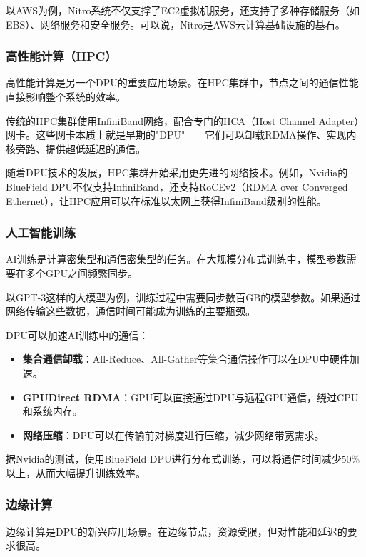 以AWS为例，Nitro系统不仅支撑了EC2虚拟机服务，还支持了多种存储服务（如EBS）、网络服务和安全服务。可以说，Nitro是AWS云计算基础设施的基石。

\subsubsection{高性能计算（HPC）}

高性能计算是另一个DPU的重要应用场景。在HPC集群中，节点之间的通信性能直接影响整个系统的效率。

传统的HPC集群使用InfiniBand网络，配合专门的HCA（Host Channel Adapter）网卡。这些网卡本质上就是早期的"DPU"——它们可以卸载RDMA操作、实现内核旁路、提供超低延迟的通信。

随着DPU技术的发展，HPC集群开始采用更先进的网络技术。例如，Nvidia的BlueField DPU不仅支持InfiniBand，还支持RoCEv2（RDMA over Converged Ethernet），让HPC应用可以在标准以太网上获得InfiniBand级别的性能。

\subsubsection{人工智能训练}

AI训练是计算密集型和通信密集型的任务。在大规模分布式训练中，模型参数需要在多个GPU之间频繁同步。

以GPT-3这样的大模型为例，训练过程中需要同步数百GB的模型参数。如果通过网络传输这些数据，通信时间可能成为训练的主要瓶颈。

DPU可以加速AI训练中的通信：

\begin{itemize}
    \item \textbf{集合通信卸载}：All-Reduce、All-Gather等集合通信操作可以在DPU中硬件加速。
    \item \textbf{GPUDirect RDMA}：GPU可以直接通过DPU与远程GPU通信，绕过CPU和系统内存。
    \item \textbf{网络压缩}：DPU可以在传输前对梯度进行压缩，减少网络带宽需求。
\end{itemize}

据Nvidia的测试，使用BlueField DPU进行分布式训练，可以将通信时间减少50\%以上，从而大幅提升训练效率。

\subsubsection{边缘计算}

边缘计算是DPU的新兴应用场景。在边缘节点，资源受限，但对性能和延迟的要求很高。

